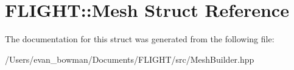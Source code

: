\hypertarget{struct_f_l_i_g_h_t_1_1_mesh}{}\section{F\+L\+I\+G\+HT\+:\+:Mesh Struct Reference}
\label{struct_f_l_i_g_h_t_1_1_mesh}


The documentation for this struct was generated from the following file\+:\begin{DoxyCompactItemize}
\item 
/\+Users/evan\+\_\+bowman/\+Documents/\+F\+L\+I\+G\+H\+T/src/Mesh\+Builder.\+hpp\end{DoxyCompactItemize}
